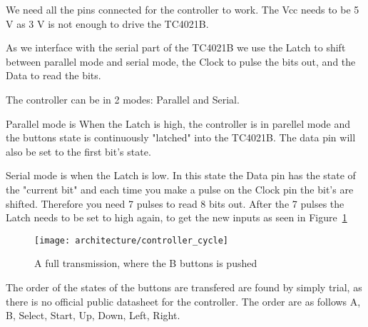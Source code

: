 We need all the pins connected for the controller to work. The Vcc needs to be 5 V as 3 V is not enough to drive the TC4021B.

As we interface with the serial part of the TC4021B we use the Latch to shift between parallel mode and serial mode, the Clock to pulse the bits out, and the Data to read the bits.

The controller can be in 2 modes: Parallel and Serial.

Parallel mode is When the Latch is high, the controller is in parellel mode and the buttons state is continuously "latched" into the TC4021B. The data pin will also be set to the first bit's state.

Serial mode is when the Latch is low. In this state the Data pin has the state of the "current bit" and each time you make a pulse on the Clock pin the bit's are shifted. Therefore you need 7 pulses to read 8 bits out. After the 7 pulses the Latch needs to be set to high again, to get the new inputs as seen in Figure~\ref{fig:controller_cycle}

\begin{figure}
\centering
\texttt{[image: architecture/controller\_cycle]}
\caption{A full transmission, where the B buttons is pushed}
\label{fig:controller_cycle}
\end{figure}

The order of the states of the buttons are transfered are found by simply trial, as there is no official public datasheet for the controller. The order are as follows A, B, Select, Start, Up, Down, Left, Right.
